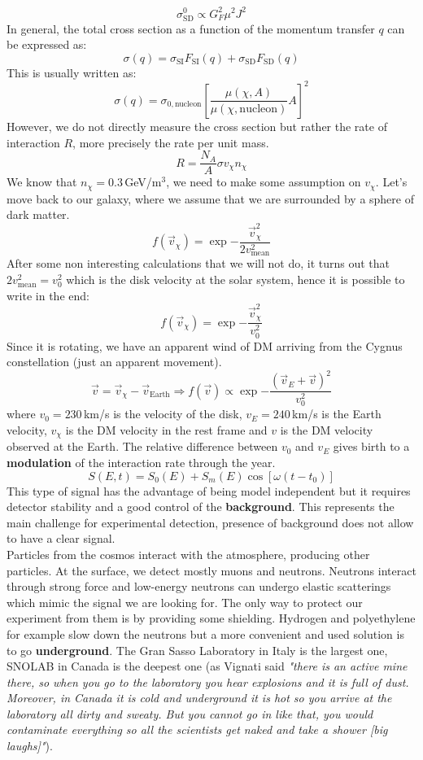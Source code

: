 \documentclass[10.75pt,a4paper,openright,bottom=2cm]{article}
\begin{document}
\[
\sigma_{\text{SD}}^0\propto G_F^2\mu^2J^2
\]
In general, the total cross section as a function of the momentum transfer $q$ can be expressed as:
\[
\sigma(q)=\sigma_{\text{SI}}F_{\text{SI}}(q)+\sigma_{\text{SD}}F_{\text{SD}}(q)
\]
This is usually written as:
\[
\sigma(q)=\sigma_{0,\text{nucleon}}\left[\frac{\mu(\chi,A)}{\mu(\chi,\text{nucleon})}A\right]^2
\]
However, we do not directly measure the cross section but rather the rate of interaction $R$, more precisely the rate per unit mass.
\[
R=\frac{N_A}{A}\sigma v_\chi n_\chi
\]
We know that $n_\chi=0.3$\,GeV/m$^3$, we need to make some assumption on $v_\chi$. Let's move back to our galaxy, where we assume that we are surrounded by a sphere of dark matter.
\[
f(\Vec{v}_\chi)=\exp{-\frac{\Vec{v}_\chi^2}{2v_{\text{mean}}^2}}
\]
After some non interesting calculations that we will not do, it turns out that $2v_{\text{mean}}^2=v_0^2$ which is the disk velocity at the solar system, hence it is possible to write in the end:
\[
f(\Vec{v}_\chi)=\exp{-\frac{\Vec{v}_\chi^2}{v_0^2}}
\]
Since it is rotating, we have an apparent wind of DM arriving from the Cygnus constellation (just an apparent movement).
\[
\Vec{v}=\Vec{v}_\chi-\Vec{v}_{\text{Earth}}\Rightarrow f(\Vec{v})\propto\exp{-\frac{(\Vec{v}_E+\Vec{v})^2}{v_0^2}}
\]
where $v_0=230$\,km/s is the velocity of the disk, $v_E=240$\,km/s is the Earth velocity, $v_\chi$ is the DM velocity in the rest frame and $v$ is the DM velocity observed at the Earth. The relative difference between $v_0$ and $v_E$ gives birth to a \textbf{modulation} of the interaction rate through the year.
\[
S(E,t)=S_0(E)+S_m(E)\cos[\omega(t-t_0)]
\]
This type of signal has the advantage of being model independent but it requires detector stability and a good control of the \textbf{background}. This represents the main challenge for experimental detection, presence of background does not allow to have a clear signal.\\
Particles from the cosmos interact with the atmosphere, producing other particles. At the surface, we detect mostly muons and neutrons. Neutrons interact through strong force and low-energy neutrons can undergo elastic scatterings which mimic the signal we are looking for. The only way to protect our experiment from them is by providing some shielding. Hydrogen and polyethylene for example slow down the neutrons but a more convenient and used solution is to go \textbf{underground}. The Gran Sasso Laboratory in Italy is the largest one, SNOLAB in Canada is the deepest one (as Vignati said \textit{"there is an active mine there, so when you go to the laboratory you hear explosions and it is full of dust. Moreover, in Canada it is cold and underground it is hot so you arrive at the laboratory all dirty and sweaty. But you cannot go in like that, you would contaminate everything so all the scientists get naked and take a shower [big laughs]"}).\\
\end{document}
